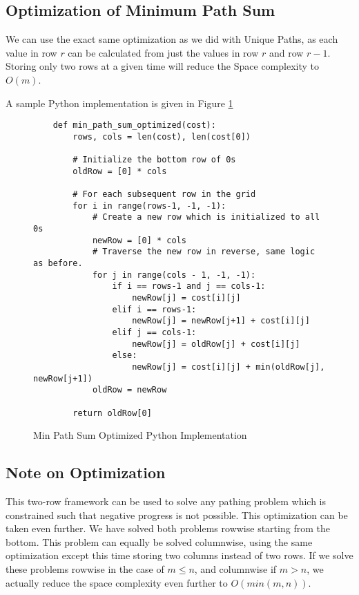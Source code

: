 \subsection{Optimization of Minimum Path Sum}
We can use the exact same optimization as we did with Unique Paths, as each value in row $r$ can be calculated from just the values in row $r$ and row $r-1$.
Storing only two rows at a given time will reduce the Space complexity to $O(m)$.

A sample Python implementation is given in Figure \ref{fig:min-path-sum-optimized}
\begin{figure}[H]
    \centering
    \begin{lstlisting}
    def min_path_sum_optimized(cost):
        rows, cols = len(cost), len(cost[0])
        
        # Initialize the bottom row of 0s
        oldRow = [0] * cols
    
        # For each subsequent row in the grid
        for i in range(rows-1, -1, -1):
            # Create a new row which is initialized to all 0s
            newRow = [0] * cols
            # Traverse the new row in reverse, same logic as before.
            for j in range(cols - 1, -1, -1):
                if i == rows-1 and j == cols-1:
                    newRow[j] = cost[i][j]
                elif i == rows-1:
                    newRow[j] = newRow[j+1] + cost[i][j]
                elif j == cols-1:
                    newRow[j] = oldRow[j] + cost[i][j]
                else:
                    newRow[j] = cost[i][j] + min(oldRow[j], newRow[j+1])
            oldRow = newRow
    
        return oldRow[0]
    \end{lstlisting}
    \caption{Min Path Sum Optimized Python Implementation}
    \label{fig:min-path-sum-optimized}
\end{figure}
\subsection{Note on Optimization}
This two-row framework can be used to solve any pathing problem which is constrained such that negative progress is not possible.
This optimization can be taken even further. We have solved both problems rowwise starting from the bottom. This problem can equally be solved columnwise,
using the same optimization except this time storing two columns instead of two rows.
If we solve these problems rowwise in the case of $m \leq n$, and columnwise if $m > n$, we actually reduce the space complexity even further to $O(min(m,n))$.